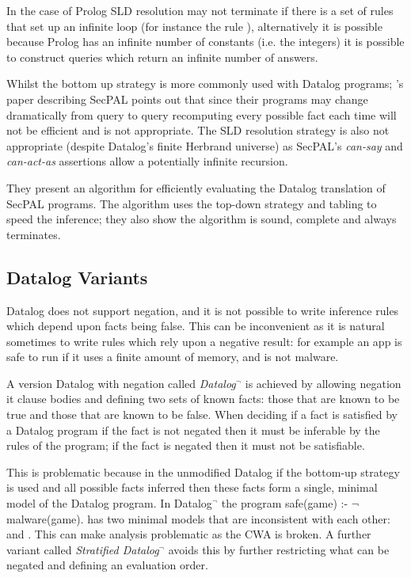 \documentclass[a4paper,12pt,sfsidenotes]{tufte-book}
\begin{document}
In the case of Prolog \ac{SLD} resolution may
not terminate if there is a set of rules that set up an infinite loop (for
instance the rule ),
alternatively it is possible because Prolog has an infinite number of constants
(i.e. the integers) it is possible to construct queries which return an infinite
number of answers.

Whilst the bottom up strategy is more commonly used with Datalog programs;
\citeauthor*{Becker:2009vt}'s paper describing SecPAL\cite{Becker:2010vh} points out that since
their programs may change dramatically from query to query recomputing every
possible fact each time  will not be efficient and is not appropriate.  The
\ac{SLD} resolution strategy is also not appropriate (despite Datalog's finite
Herbrand universe) as SecPAL's \emph{can-say} and \emph{can-act-as} assertions
allow a potentially infinite recursion.

They present an algorithm for efficiently evaluating the Datalog translation of
SecPAL programs.  The algorithm uses the top-down strategy and tabling to speed
the inference; they also show the algorithm is sound, complete and always
terminates. 


\subsection{Datalog Variants}

Datalog does not support negation, and it is not possible to write inference
rules which depend upon facts being false.  This can be inconvenient as it is
natural sometimes to write rules which rely upon a negative result: for example
an app is safe to run if it uses a finite amount of memory, and is not malware.

A version Datalog with negation called \emph{Datalog$^\lnot$}\cite{Ceri:1989ff} is
achieved by allowing negation it clause bodies and defining two sets of known
facts: those that are known to be true and those that are known to be false.
When deciding if a fact is satisfied by a Datalog program if the fact is not
negated then it must be inferable by the rules of the program; if the fact is
negated then it must not be satisfiable.  

This is problematic because in the unmodified Datalog if the bottom-up strategy
is used and all possible facts inferred then these facts form a single, minimal
model of the Datalog program.  In Datalog$^\lnot$ the program \textsf{safe(game)
:- $\mathsf\lnot$ malware(game).} has two minimal models that are inconsistent
with each other:  and .  This can make
analysis problematic as the \ac{CWA} is broken. A further variant called
\emph{Stratified Datalog$^\lnot$} avoids this by further restricting what can be
negated and defining an evaluation order\cite{Apt:1986vj}.
\end{document}
